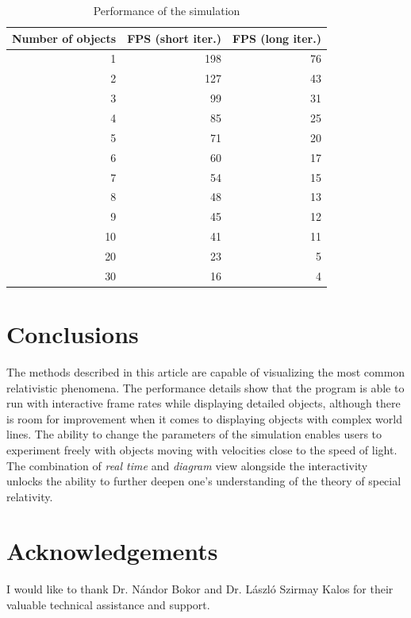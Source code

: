 \documentclass{egpubl}
\begin{document}
\begin{table}
\caption{Performance of the simulation}
\label{tab:performance}
\begin{tabular}{|r|r|r|}
\hline
Number of objects & FPS (short iter.) & FPS (long iter.)\\
\hline
\hline
1&198&76\\
\hline
2&127&43\\
\hline
3&99&31\\
\hline
4&85&25\\
\hline
5&71&20\\
\hline
6&60&17\\
\hline
7&54&15\\
\hline
8&48&13\\
\hline
9&45&12\\
\hline
10&41&11\\
\hline
20&23&5\\
\hline
30&16&4\\
\hline

\end{tabular}
\end{table}

\section{Conclusions}
\label{sec:concl}
The methods described in this article are capable of visualizing the most common relativistic phenomena. The performance details show that the program is able to run with interactive frame rates while displaying detailed objects, although there is room for improvement when it comes to displaying objects with complex world lines. The ability to change the parameters of the simulation enables users to experiment freely with objects moving with velocities close to the speed of light. The combination of \emph{real time} and  \emph{diagram} view alongside the interactivity unlocks the ability to further deepen one's understanding of the theory of special relativity.

\section*{Acknowledgements}
I would like to thank Dr. Nándor Bokor and Dr. László Szirmay Kalos for their valuable technical assistance and support.
\end{document}
